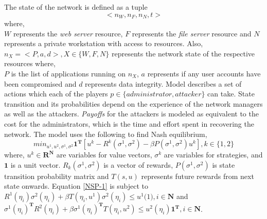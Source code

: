 \documentclass[conference]{IEEEtran}
\begin{document}
The state of the network is defined as a tuple
\begin{equation}
	<n_{W}, n_{F}, n_{N}, t>
\end{equation}
where,\\
$W$ represents the \textit{web server} resource, $F$ represents the \textit{file server} resource and $N$ represents a private workstation with access to resources.
Also, $n_{X} = <P,a,d>, X\in \{W, F, N\}$ represents the network state of the respective resources where,\\
$P$ is the list of applications running on $n_{X}$, $a$ represents if any user accounts have been compromised and $d$ represents data integrity.
Model describes a set of actions which each of the players $p \in \{administrator,attacker\}$ can take.
State transition and its probabilities depend on the experience of the network managers as well as the attackers.
\textit{Payoffs} for the attackers is modeled as equivalent to the cost for the administrators, which is the time and effort spent in recovering the network.
The model uses the following to find Nash equilibrium,
\begin{equation} \label{NSP-1}
	min_{u^{1},u^{2},\sigma^{1},\sigma^{2}} \mathbf{1}^{\mathbf{T}}[u^{k} - R^{k}(\sigma^{1},\sigma^{2}) - \beta P(\sigma^{1},\sigma^{2})u^{k}], k \in \{1,2\}
\end{equation}
where, $u^{k} \in \mathbf{R}^{\mathbf{N}}$ are variables for value vectors, $\sigma^{k}$ are variables for strategies, and $\mathbf{1}$ is a unit vector.
$R_{k}(\sigma^{1}, \sigma^{2})$ is a vector of rewards, $P(\sigma^{1}, \sigma^{2})$ is state transition probability matrix and $T(s,u)$ represents future rewards from next state onwards.
Equation \ref{NSP-1} is subject to\\
$R^{1}(\eta_{i})\sigma^{2}(\eta_{i}) + \beta T(\eta_{i},u^{1})\sigma^{2}(\eta_{i}) \le u^{1}\mathbf(1), i \in \mathbf{N}$ and \\
$\sigma^{1}(\eta_{i})^{\mathbf{T}}R^{2}(\eta_{i}) + \beta\sigma^{1}(\eta_{i})^{\mathbf{T}}T(\eta_{i},u^{2}) \le u^{2}(\eta_{i})\mathbf{1}^{\mathbf{T}}, i \in \mathbf{N}$.
\end{document}
